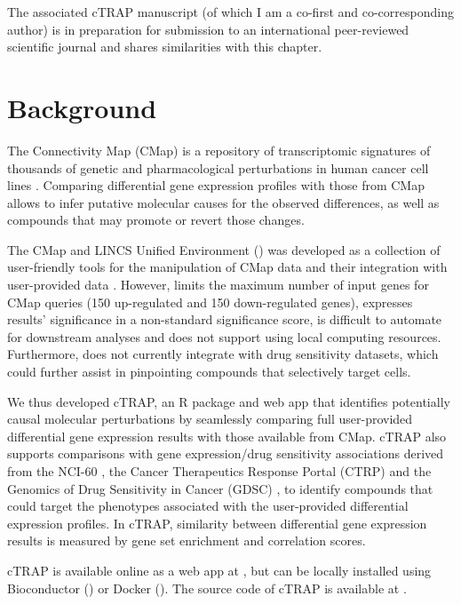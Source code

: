 The associated cTRAP manuscript (of which I am a co-first and co-corresponding author) is in preparation for submission to an international peer-reviewed scientific journal and shares similarities with this chapter.

\section{Background}

The Connectivity Map (CMap) is a repository of transcriptomic signatures of thousands of genetic and pharmacological perturbations in human cancer cell lines \cite{subramanian:2017ul}. Comparing differential gene expression profiles with those from CMap allows to infer putative molecular causes for the observed differences, as well as compounds that may promote or revert those changes.

The CMap and LINCS Unified Environment () was developed as a collection of user-friendly tools for the manipulation of CMap data and their integration with user-provided data \cite{subramanian:2017ul}. However,  limits the maximum number of input genes for CMap queries (150 up-regulated and 150 down-regulated genes), expresses results' significance in a non-standard significance score, is difficult to automate for downstream analyses and does not support using local computing resources. Furthermore,  does not currently integrate with drug sensitivity datasets, which could further assist in pinpointing compounds that selectively target cells.

We thus developed cTRAP, an R package and web app that identifies potentially causal molecular perturbations by seamlessly comparing full user-provided differential gene expression results with those available from CMap. cTRAP also supports comparisons with gene expression/drug sensitivity associations derived from the NCI-60 \cite{shoemaker:2006wi}, the Cancer Therapeutics Response Portal (CTRP) \cite{seashore-ludlow:2015ws} and the Genomics of Drug Sensitivity in Cancer (GDSC) \cite{yang:2012vk}, to identify compounds that could target the phenotypes associated with the user-provided differential expression profiles. In cTRAP, similarity between differential gene expression results is measured by gene set enrichment \cite{subramanian:2017ul,subramanian:2005wu} and correlation scores.

cTRAP is available online as a web app at , but can be locally installed using Bioconductor () or Docker (). The source code of cTRAP is available at .

